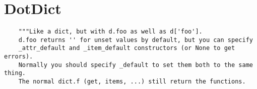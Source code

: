 












\section{DotDict}
\begin{verbatim}
    """Like a dict, but with d.foo as well as d['foo'].
    d.foo returns '' for unset values by default, but you can specify
    _attr_default and _item_default constructors (or None to get errors).
    Normally you should specify _default to set them both to the same thing.
    The normal dict.f (get, items, ...) still return the functions.
\end{verbatim}



